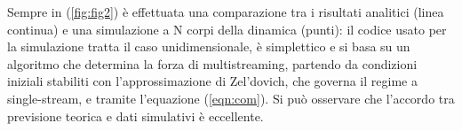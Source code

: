 Sempre in (\ref{fig:fig2}) è effettuata una comparazione tra i risultati analitici (linea continua) e una simulazione 
a N corpi della dinamica (punti): il codice usato per la simulazione tratta il caso unidimensionale, è simplettico
e si basa su un algoritmo che determina la forza di multistreaming, partendo da condizioni iniziali stabiliti con
l'approssimazione di Zel'dovich, che governa il regime a single-stream, e tramite l'equazione (\ref{eqn:com}).
Si può osservare che l'accordo tra previsione teorica e dati simulativi è eccellente.